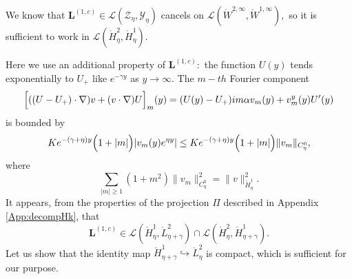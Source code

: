 \documentclass[11pt]{article}
\begin{document}
We know that $\boldsymbol{L}^{(1,c)}\in \mathcal{L}(\mathcal{Z}_\eta,\mathcal{Y}_\eta)$
cancels on $\mathcal{L}(\mathring{W}^{2,\infty },\mathring{W}%
^{1,\infty }),$ so it is sufficient to work in $\mathcal{L}(\mathring{H}%
_{\eta}^{2},\mathring{H}_{\eta}^{1}).$

Here we use an additional property of $\boldsymbol{L}^{(1,c)}:$ the function $%
U(y)$ tends exponentially to $U_+$ like $e^{-\gamma y}$ as $y\rightarrow \infty$. 
The $m-th$ Fourier component 
\begin{equation*}
\Bigl[ ((U-U_+)\cdot \nabla )v+(v\cdot \nabla )U \Bigr]_{m}(y)=(U(y)-U_+)im\alpha
v_{m}(y)+v_{m}^{y}(y)U^{\prime }(y)
\end{equation*}%
is bounded by%
\begin{equation*}
Ke^{-(\gamma +\eta)y} \Bigl( 1+|m| \Bigr) |v_{m}(y)e^{\eta y}|\leq Ke^{-(\gamma
+\eta)y} \Bigl( 1+|m| \Bigr) \|v_{m}\|_{C_{\eta}^{0}},
\end{equation*}%
where%
\begin{equation*}
\sum_{|m|\geq 1}(1+m^{2}) \|v_{m}\|_{C_{\eta}^{0}}^{2}=\|v\|_{\mathring{H}%
_{\eta}^{1}}^{2}.
\end{equation*}%
It appears, from the properties of the projection $\Pi $ described in
Appendix \ref{App:decompHk}, that 
\begin{equation*}
\boldsymbol{L}^{(1,c)}\in \mathcal{L}(\mathring{H}_{\eta}^{1},\mathring{L}%
_{\eta+\gamma }^{2})\cap \mathcal{L}(\mathring{H}_{\eta}^{2},\mathring{H}%
_{\eta+\gamma }^{1}).
\end{equation*}%
Let us show that the identity map $\mathring{H}_{\eta+\gamma
}^{1}\hookrightarrow \mathring{L}_{\eta}^{2}$ is compact, which is sufficient
for our purpose.
\end{document}
